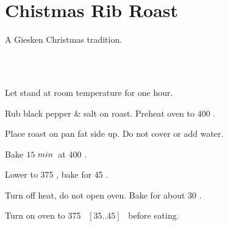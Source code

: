\section{Chistmas Rib Roast}


\begin{recipestats}[
	servings=$2\;person \; / \; 1 \; lb$,
	preptime=1~\onefourth~\hour,
	bakingtime=2~\onefourth~\hour,
	source=Ralph Nelson (Fa),
	]
\end{recipestats}


\begin{recipeabstract}
	A Giesken Christmas tradition.
\end{recipeabstract}

\begin{ingredientcolumns}[1]
	\begin{ingredientblock}
		\\
		\\
	\end{ingredientblock}
\end{ingredientcolumns}

\begin{preparation}
\item Let stand at room temperature for one hour.

\item Rub black pepper \& salt on roast. Preheat oven to $400$ \Fahrenheit.

\item Place roast on pan fat side up. Do not cover or add water.

\item Bake $15~\minute$~at 400 \Fahrenheit.

\item Lower to 375 \Fahrenheit, bake for 45 \minute.

\item Turn off heat, do not open oven. Bake for about 30 \minute.


\item Turn on oven to 375 \Fahrenheit~$[35..45]$ \minute~before eating.
\end{preparation}

\recipeend%
